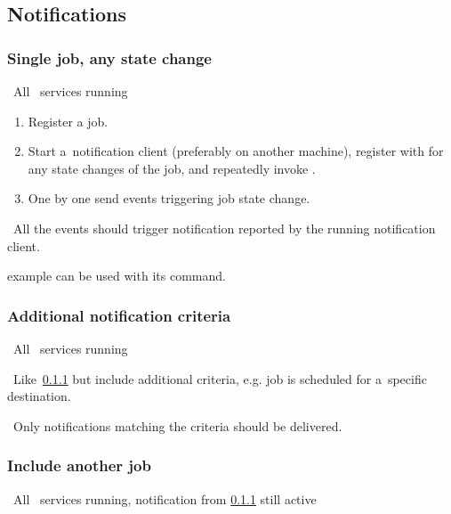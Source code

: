 \subsection{Notifications}



\subsubsection{Single job, any state change}
\label{notif1}
\req\ All \LB\ services running

\what
\begin{enumerate}
\item Register a job.
\item Start a~notification client (preferably on another machine),
register with  for any state changes of the job,
and repeatedly invoke .
\item One by one send events triggering job state change.
\end{enumerate}

\result\ All the events should trigger notification reported by the running
notification client.

\begin{hints}
 example can be used with its  command.
\end{hints}



\subsubsection{Additional notification criteria}
\label{notif-complex}
\req\ All \LB\ services running

\how\ Like~\ref{notif1} but include additional criteria,
e.g. job is scheduled for a~specific destination.

\result\ Only notifications matching the criteria should be delivered.




\subsubsection{Include another job}
\label{notif2}
\req\ All \LB\ services running, notification from \ref{notif1} still active

